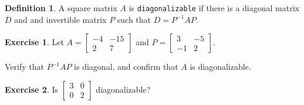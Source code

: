 \documentclass{beamer}
\newcommand{\fn}{\insertframenumber}
\theoremstyle{definition}
\newtheorem{exercise}{Exercise}
\newtheorem*{defn}{Definition}
\renewcommand{\emph}[1]{{\color{blue}\texttt{#1}}}
\begin{document}
\begin{frame}{\fn}
\begin{defn}
	A square matrix $A$ is \emph{diagonalizable} if there is a diagonal matrix $D$ and and invertible matrix $P$ such that $D=P^{-1}AP$.
\end{defn}
\begin{exercise}\label{first}
Let $A=\begin{bmatrix}-4&-15\\2&7\end{bmatrix}$ and $P=\begin{bmatrix}3&-5\\-1&2\end{bmatrix}$.

Verify that $P^{-1}AP$ is diagonal, and confirm that $A$ is diagonalizable.
\end{exercise}
\begin{exercise}
	Is $\begin{bmatrix}
	3&0\\0&2
	\end{bmatrix}$ diagonalizable?
\end{exercise}
\end{frame}
\end{document}
